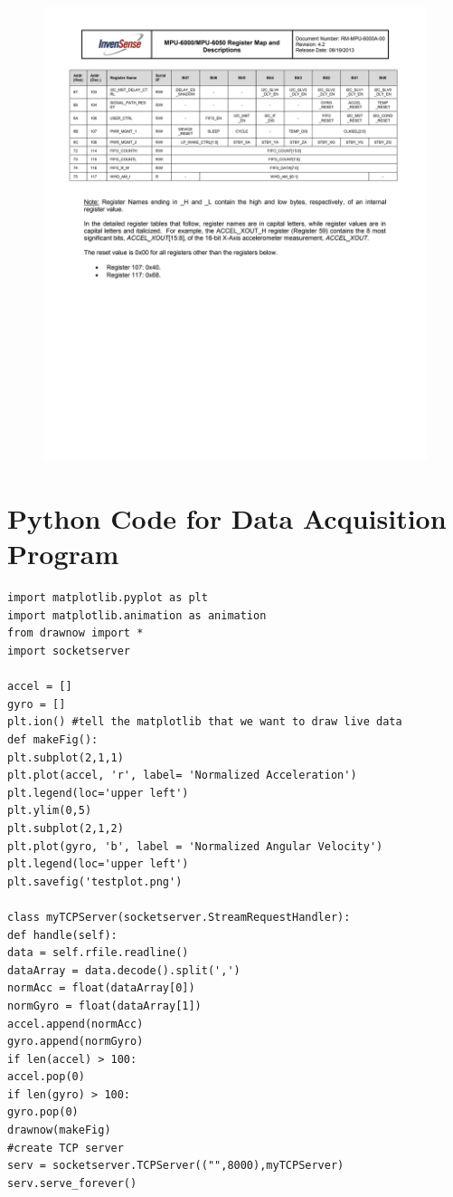 \documentclass[letterpaper,12pt,titlepage,oneside,final]{book}
\begin{document}
\begin{figure}[h!]
	\includegraphics{7}
\end{figure}
\chapter{Python Code for Data Acquisition Program}
\begin{verbatim}
import matplotlib.pyplot as plt
import matplotlib.animation as animation
from drawnow import *
import socketserver

accel = []
gyro = []
plt.ion() #tell the matplotlib that we want to draw live data
def makeFig():
plt.subplot(2,1,1)
plt.plot(accel, 'r', label= 'Normalized Acceleration')
plt.legend(loc='upper left')
plt.ylim(0,5)
plt.subplot(2,1,2)
plt.plot(gyro, 'b', label = 'Normalized Angular Velocity')
plt.legend(loc='upper left')
plt.savefig('testplot.png')

class myTCPServer(socketserver.StreamRequestHandler):
def handle(self):
data = self.rfile.readline()
dataArray = data.decode().split(',')
normAcc = float(dataArray[0])
normGyro = float(dataArray[1])
accel.append(normAcc)
gyro.append(normGyro)
if len(accel) > 100:
accel.pop(0)
if len(gyro) > 100:
gyro.pop(0)
drawnow(makeFig)
#create TCP server
serv = socketserver.TCPServer(("",8000),myTCPServer)
serv.serve_forever()
\end{verbatim}%
\end{document}
